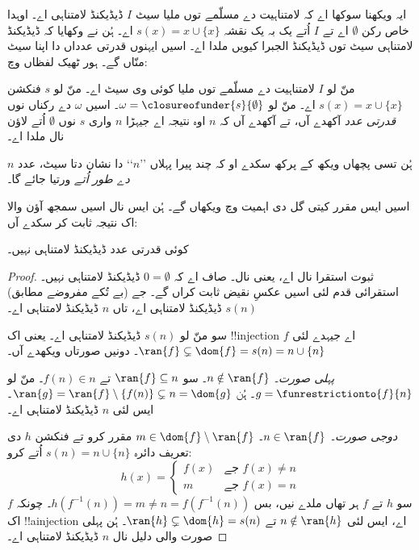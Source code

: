 \documentclass[../../../include/open-logic-section]{subfiles}
\begin{document}
ایہ ویکھنا سوکھا اے کہ لامتناہیت دے مسلّمے توں ملیا سیٹ $I$ ڈیڈیکنڈ
لامتناہی اے۔ اوہدا خاص رکن $\emptyset$ اے تے $I$ اُتے یک بہ یک نقشہ
$s(x) = x\cup \{x\}$ اے۔ ہُن 
نے وکھایا کہ ڈیڈیکنڈ لامتناہی سیٹ توں ڈیڈیکنڈ الجبرا کیویں ملدا اے۔ اسیں
ایہنوں قدرتی عدداں دا اپنا سیٹ منّاں گے۔ ہور ٹھیک لفظاں وچ:
\begin{defn}
منّ لو $I$ لامتناہیت دے مسلّمے توں ملیا کوئی وی سیٹ اے۔ منّ لو $s$
فنکشن $s(x) = x \cup \{x\}$ اے۔ منّ لو $\omega = \closureofunder{s}{\emptyset}$۔
اسیں $\omega$ دے رکناں نوں \emph{قدرتی عدد} آکھدے آں، تے آکھدے آں کہ $n$
اوہ نتیجہ اے جیہڑا $n$ واری $s$ نوں $\emptyset$ اُتے لاؤن نال ملدا اے۔
\end{defn}

ہُن تسی پچھاں ویکھ کے پرکھ سکدے او کہ چند پیرا پہلاں ’’$n$‘‘ دا نشان
دتا سیٹ، عدد $n$ \emph{دے طور اُتے} ورتیا جائے گا۔

اسیں ایس مقرر کیتی گل دی اہمیت  وچ ویکھاں گے۔
ہُن ایس نال اسیں سمجھ آؤن والا اک نتیجہ ثابت کر سکدے آں:

\begin{prop}
کوئی قدرتی عدد ڈیڈیکنڈ لامتناہی نہیں۔
\end{prop}

\begin{proof}
ثبوت استقرا نال اے، یعنی  نال۔
صاف اے کہ $0 = \emptyset$ ڈیڈیکنڈ لامتناہی نہیں۔ استقرائی قدم لئی اسیں
عکسِ نقیض ثابت کراں گے۔ جے (بے تُکے مفروضے مطابق) $s(n)$ ڈیڈیکنڈ لامتناہی
اے، تاں $n$ ڈیڈیکنڈ لامتناہی اے۔

سو منّ لو $s(n)$ ڈیڈیکنڈ لامتناہی اے۔ یعنی اک !!{injection} $f$ اے
جیہدے لئی $\ran{f}\subsetneq \dom{f} = s(n) = n \cup \{n\}$۔
دونیں صورتاں ویکھدے آں۔

\emph{پہلی صورت۔ $n \notin \ran{f}$۔} سو $\ran{f} \subseteq n$ تے
$f(n) \in n$۔ منّ لو $g = \funrestrictionto{f}{n}$۔ ہُن
$\ran{g} = \ran{f} \setminus \{f(n)\} \subsetneq n = \dom{g}$۔
ایس لئی $n$ ڈیڈیکنڈ لامتناہی اے۔

\emph{دوجی صورت۔ $n \in \ran{f}$۔} $m \in \dom{f} \setminus \ran{f}$ مقرر
کرو تے فنکشن $h$ دی تعریف دائرہ $s(n) = n \cup \{n\}$ اُتے کرو:
\[
h(x) =
	\begin{cases}
		f(x) & \text{جے }f(x) \neq n\\
		m & \text{جے }f(x)=n
	\end{cases}
\]
سو $h$ تے $f$ ہر تھاں ملدے نیں، بس $h(f^{-1}(n)) = m \neq n = f(f^{-1}(n))$۔
چونکہ $f$ اک !!a{injection} اے، ایس لئی $n \notin \ran{h}$ تے
$\ran{h} \subsetneq \dom{h} = s(n)$۔ ہُن پہلی صورت والی دلیل نال
$n$ ڈیڈیکنڈ لامتناہی اے۔
\end{proof}
\end{document}
